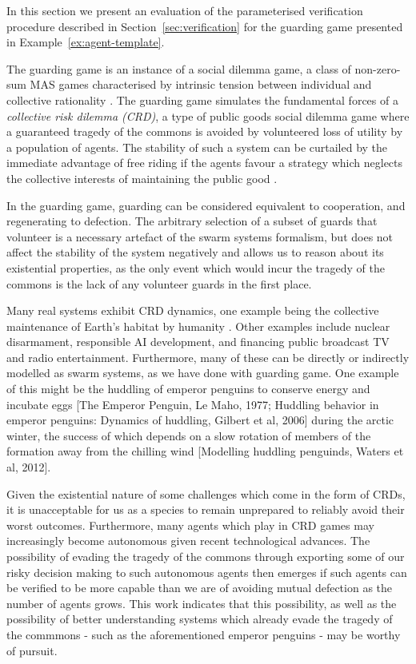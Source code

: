 
In this section we present an evaluation of the parameterised verification
procedure described in Section~\ref{sec:verification} for the guarding game
presented in Example~\ref{ex:agent-template}.



The guarding game is an instance of a social dilemma game, a class of
non-zero-sum MAS games characterised by intrinsic tension between individual
and collective rationality \cite{VanlangeJPV13}. The guarding game simulates
the fundamental forces of a \emph{collective risk dilemma (CRD)}, a type of
public goods social dilemma game where a guaranteed tragedy of the commons
\cite{Hardin68} is avoided by volunteered loss of utility by a population of
agents. The stability of such a system can be curtailed by the immediate
advantage of free riding if the agents favour a strategy which neglects the
collective interests of maintaining the public good \cite{SantosP11}.

In the guarding game, guarding can be considered equivalent to cooperation, and
regenerating to defection. The arbitrary selection of a subset of guards that
volunteer is a necessary artefact of the swarm systems formalism, but does not
affect the stability of the system negatively and allows us to reason about its
existential properties, as the only event which would incur the tragedy of the
commons is the lack of any volunteer guards in the first place.

Many real systems exhibit CRD dynamics, one example being the collective
maintenance of Earth's habitat by humanity \cite{Smirnov19}. Other examples
include nuclear disarmament, responsible AI development, and financing public
broadcast TV and radio entertainment. Furthermore, many of these can be
directly or indirectly modelled as swarm systems, as we have done with guarding
game. One example of this might be the huddling of emperor penguins to conserve
energy and incubate eggs [The Emperor Penguin, Le Maho, 1977; Huddling behavior in emperor penguins: Dynamics of huddling, Gilbert et al, 2006]
during the arctic winter, the success of which depends on a slow rotation of
members of the formation away from the chilling wind [Modelling huddling penguinds, Waters et al, 2012].

Given the existential nature of some challenges which come in the form of CRDs,
it is unacceptable for us as a species to remain unprepared to reliably avoid
their worst outcomes. Furthermore, many agents which play in CRD games may
increasingly become autonomous given recent technological advances. The
possibility of evading the tragedy of the commons through exporting some of our
risky decision making to such autonomous agents then emerges if such agents can
be verified to be more capable than we are of avoiding mutual defection as the
number of agents grows. This work indicates that this possibility, as well as
the possibility of better understanding systems which already evade the tragedy
of the commmons - such as the aforementioned emperor penguins - may be worthy
of pursuit.

